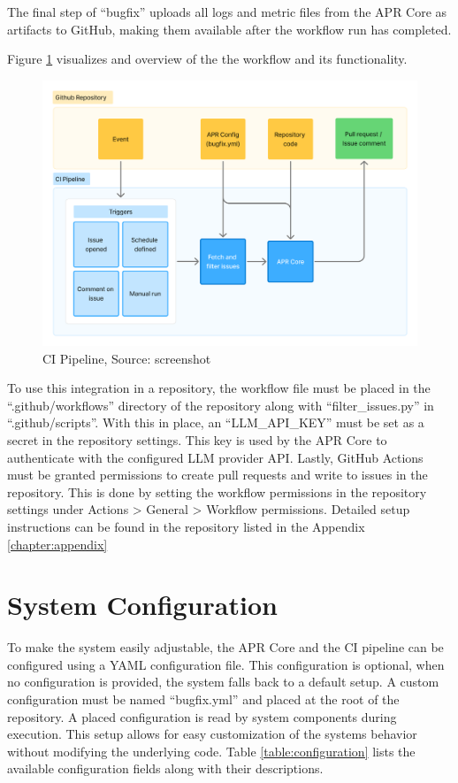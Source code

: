The final step of ``bugfix'' uploads all logs and metric files from the APR Core as artifacts to GitHub, making them available after the workflow run has completed.

Figure \ref{fig:ci} visualizes and overview of the the workflow and its functionality.

\begin{figure}[H]
    \centering
    \includegraphics[width=1\textwidth]{images/flowcharts/ci.png}
    \caption{CI Pipeline, Source: screenshot}
    \label{fig:ci}
\end{figure}

To use this integration in a repository, the workflow file must be placed in the ``.github/workflows'' directory of the repository along with ``filter\_issues.py'' in ``.github/scripts''. With this in place, an ``LLM\_API\_KEY'' must be set as a secret in the repository settings. This key is used by the APR Core to authenticate with the configured \ac{LLM} provider API. Lastly, GitHub Actions must be granted permissions to create pull requests and write to issues in the repository. This is done by setting the workflow permissions in the repository settings under Actions > General > Workflow permissions. Detailed setup instructions can be found in the repository listed in the Appendix \ref{chapter:appendix}

\section{System Configuration}
To make the system easily adjustable, the APR Core and the \ac{CI} pipeline can be configured using a YAML configuration file. This configuration is optional, when no configuration is provided, the system falls back to a default setup. A custom configuration must be named ``bugfix.yml'' and placed at the root of the repository. A placed configuration is read by system components during execution. This setup allows for easy customization of the systems behavior without modifying the underlying code. Table \ref{table:configuration} lists the available configuration fields along with their descriptions.

